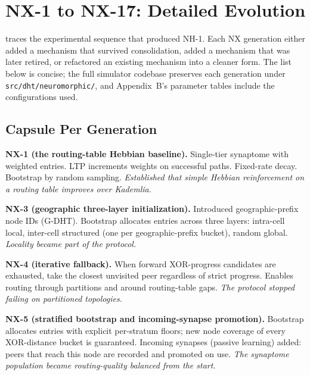 \documentclass[twoside,nobib]{tufte-book}
\newcommand{\GDHT}{G-DHT\xspace}
\begin{document}
\appendix


\chapter{NX-1 to NX-17: Detailed Evolution}
\label{app:nx-evolution}

 traces the experimental sequence
that produced NH-1. Each NX generation either added a mechanism
that survived consolidation, added a mechanism that was
later retired, or refactored an existing mechanism into a
cleaner form. The list below is concise; the full simulator
codebase preserves each generation under
\texttt{src/dht/neuromorphic/}, and Appendix~B's parameter
tables include the configurations used.

\section{Capsule Per Generation}

\textbf{NX-1 (the routing-table Hebbian baseline).}
Single-tier synaptome with weighted entries. LTP increments
weights on successful paths. Fixed-rate decay. Bootstrap by
random sampling. \emph{Established that simple Hebbian
reinforcement on a routing table improves over Kademlia.}

\textbf{NX-3 (geographic three-layer initialization).}
Introduced geographic-prefix node IDs (\GDHT). Bootstrap
allocates entries across three layers: intra-cell local,
inter-cell structured (one per geographic-prefix bucket),
random global. \emph{Locality became part of the protocol.}

\textbf{NX-4 (iterative fallback).} When forward XOR-progress
candidates are exhausted, take the closest unvisited peer
regardless of strict progress. Enables routing through
partitions and around routing-table gaps. \emph{The protocol
stopped failing on partitioned topologies.}

\textbf{NX-5 (stratified bootstrap and incoming-synapse
promotion).} Bootstrap allocates entries with explicit per-stratum
floors; new node coverage of every XOR-distance bucket is
guaranteed. Incoming synapses (passive learning) added: peers
that reach this node are recorded and promoted on use. \emph{The
synaptome population became routing-quality balanced from the
start.}
\end{document}
